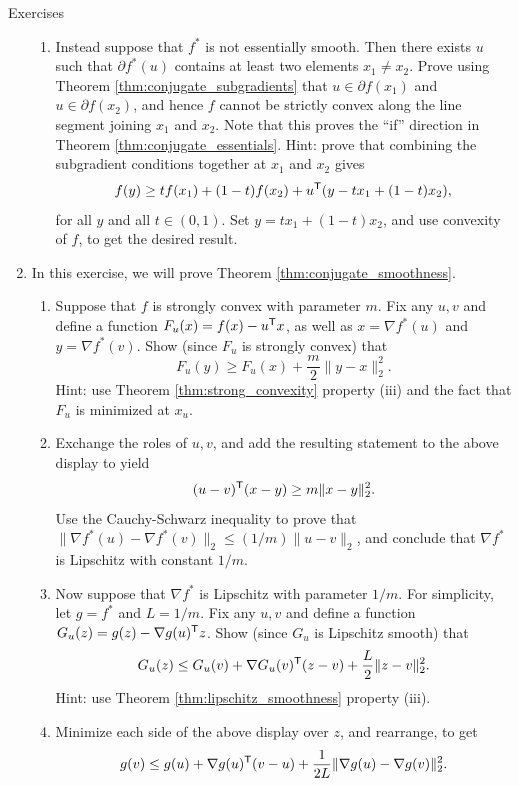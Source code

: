 \begin{xcb}{Exercises}
\begin{enumerate}[label=\thechapter.\arabic*]
\begin{enumerate}[label=\alph*.]
\item Instead suppose that $f^*$ is not essentially smooth. Then there exists
  $u$ such that $\partial f^*(u)$ contains at least two elements $x_1 \not= 
  x_2$. Prove using Theorem \ref{thm:conjugate_subgradients} that $u \in
  \partial f(x_1)$ and $u \in \partial f(x_2)$, and hence $f$ cannot be strictly
  convex along the line segment joining $x_1$ and $x_2$. Note that this proves
  the ``if'' direction in Theorem \ref{thm:conjugate_essentials}. Hint: prove
  that combining the subgradient conditions together at $x_1$ and $x_2$ gives  
  \[
  f(y) \geq tf(x_1) + (1-t)f(x_2) + u^{\mathsf{T}} (y - tx_1 + (1-t)x_2),
  \]
  for all $y$ and all $t \in (0,1)$. Set $y = tx_1 + (1-t)x_2$, and use
  convexity of $f$, to get the desired result. 
\end{enumerate}

\item \label{ex:conjugate_smoothness}
  In this exercise, we will prove Theorem \ref{thm:conjugate_smoothness}.

\begin{enumerate}[label=\alph*.]
\item Suppose that $f$ is strongly convex with parameter $m$. Fix any $u,v$ and
  define a function $F_u(x) = f(x) - u^{\mathsf{T}} x$, as well as $x = \nabla f^*(u)$ and
  $y = \nabla f^*(v)$. Show (since $F_u$ is strongly convex) that 
  \[
  F_u(y) \geq F_u(x) + \frac{m}{2} \|y-x\|_2^2.
  \]
  Hint:  use Theorem \ref{thm:strong_convexity} property (iii) and the fact that
  $F_u$ is minimized at $x_u$. 

\item Exchange the roles of $u,v$, and add the resulting statement to the above
  display to yield 
  \[
  (u-v)^{\mathsf{T}} (x-y) \geq m \|x-y\|_2^2.
  \]
  Use the Cauchy-Schwarz inequality to prove that $\|\nabla f^*(u) - \nabla
  f^*(v)\|_2 \leq (1/m) \|u-v\|_2$, and conclude that $\nabla f^*$ is Lipschitz
  with constant $1/m$.    

\item Now suppose that $\nabla f^*$ is Lipschitz with parameter $1/m$. For
  simplicity, let $g=f^*$ and $L=1/m$. Fix any $u,v$ and define a function
  $G_u(z) = g(z) - \nabla g(u)^{\mathsf{T}} z$. Show (since $G_u$ is Lipschitz smooth) 
  that  
  \[
  G_u(z) \leq G_u(v) + \nabla G_u(v)^{\mathsf{T}} (z-v) + \frac{L}{2}\|z-v\|_2^2. 
  \]
  Hint: use Theorem \ref{thm:lipschitz_smoothness} property (iii).

\item Minimize each side of the above display over $z$, and rearrange, to get  
  \[
  g(v) \leq g(u) + \nabla g(u)^{\mathsf{T}} (v-u) + \frac{1}{2L}\|\nabla g(u) - \nabla 
  g(v)\|_2^2. 
  \]


\end{enumerate}
\end{enumerate}
\end{xcb}
